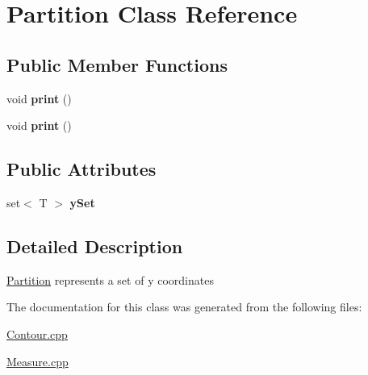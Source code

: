 \hypertarget{classPartition}{}\section{Partition Class Reference}
\label{classPartition}
\subsection*{Public Member Functions}
\begin{DoxyCompactItemize}
\item 
\mbox{\label{classPartition_a84674cf42f548ed5216d8a568e9f20d3}} 
void {\bfseries print} ()
\item 
\mbox{\label{classPartition_a84674cf42f548ed5216d8a568e9f20d3}} 
void {\bfseries print} ()
\end{DoxyCompactItemize}
\subsection*{Public Attributes}
\begin{DoxyCompactItemize}
\item 
\mbox{\label{classPartition_a043d4dc0f8e49d4167f6c0b8f1327d55}} 
set$<$ T $>$ {\bfseries y\+Set}
\end{DoxyCompactItemize}


\subsection{Detailed Description}
\hyperlink{classPartition}{Partition} represents a set of y coordinates 

The documentation for this class was generated from the following files\+:\begin{DoxyCompactItemize}
\item 
\hyperlink{Contour_8cpp}{Contour.\+cpp}\item 
\hyperlink{Measure_8cpp}{Measure.\+cpp}\end{DoxyCompactItemize}
